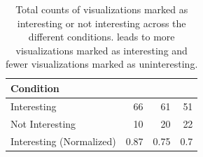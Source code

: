 \begin{table}[ht!]
	\centering
	\begin{tabular}{|l|rrr|}
	\hline
	 \small{Condition}             &   \small{\system} &   \small{\BFS} &   \small{\cluster} \\
	\hline
	 \small{Interesting}            &  \cellcolor{blue!25}       66    & 61    &      51   \\
	 \small{Not Interesting}        &  \cellcolor{blue!25}       10    & 20    &      22   \\
	 \small{Interesting (Normalized)} &   \cellcolor{blue!25}       0.87 &  0.75 &       0.7 \\
	\hline
	\end{tabular}
	\caption{Total counts of visualizations marked as interesting or not interesting across the different conditions. \system leads to more visualizations marked as interesting and fewer visualizations marked as uninteresting.}
	\label{table:interestingScore}
	\vspace{-10pt}
\end{table}
